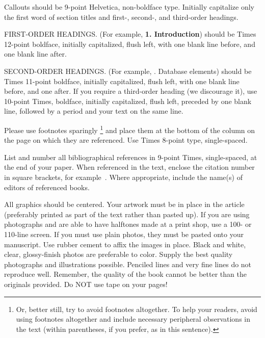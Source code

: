 \documentclass[times, 10pt,two column]{article}
\begin{document}
\noindent Callouts should be 9-point Helvetica, non-boldface type. 
Initially capitalize only the first word of section titles and first-, 
second-, and third-order headings.

FIRST-ORDER HEADINGS. (For example, {\large \bf 1. Introduction}) 
should be Times 12-point boldface, initially capitalized, flush left, 
with one blank line before, and one blank line after.

SECOND-ORDER HEADINGS. (For example, {. Database elements}) 
should be Times 11-point boldface, initially capitalized, flush left, 
with one blank line before, and one after. If you require a third-order 
heading (we discourage it), use 10-point Times, boldface, initially 
capitalized, flush left, preceded by one blank line, followed by a period 
and your text on the same line.


Please use footnotes sparingly%
\footnote
   {%
     Or, better still, try to avoid footnotes altogether.  To help your 
     readers, avoid using footnotes altogether and include necessary 
     peripheral observations in the text (within parentheses, if you 
     prefer, as in this sentence).
   }
and place them at the bottom of the column on the page on which they are 
referenced. Use Times 8-point type, single-spaced.



List and number all bibliographical references in 9-point Times, 
single-spaced, at the end of your paper. When referenced in the text, 
enclose the citation number in square brackets, for example~\cite{ex1}. 
Where appropriate, include the name(s) of editors of referenced books.


All graphics should be centered. Your artwork must be in place in the 
article (preferably printed as part of the text rather than pasted up). 
If you are using photographs and are able to have halftones made at a 
print shop, use a 100- or 110-line screen. If you must use plain photos, 
they must be pasted onto your manuscript. Use rubber cement to affix the 
images in place. Black and white, clear, glossy-finish photos are 
preferable to color. Supply the best quality photographs and 
illustrations possible. Penciled lines and very fine lines do not 
reproduce well. Remember, the quality of the book cannot be better than 
the originals provided. Do NOT use tape on your pages!
\end{document}
